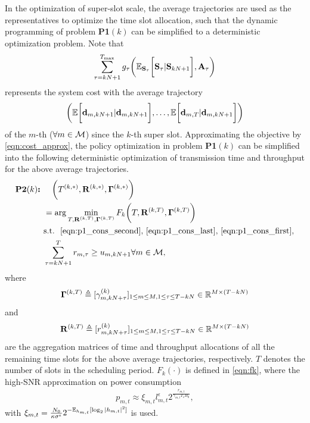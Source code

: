 In the optimization of super-slot scale, the average trajectories are used as the representatives to optimize the time slot allocation, such that the dynamic programming of problem \textbf{P1$(k)$} can be simplified to a deterministic optimization problem.
Note that
\begin{align}
    \sum_{\tau=kN+1}^{{T_{\max}}} g_{\tau}\bigg(
        \mathbb{E}_{\mathbf{S}_{\tau}}\bigg[ \mathbf{S}_{\tau} | \mathbf{S}_{kN+1} \bigg], \mathbf{A}_{\tau}
    \bigg)
    \label{eqn:cost_approx}
\end{align}
represents the system cost with the average trajectory
\begin{align}
    \bigg(
        \mathbb{E}\bigg[ \mathbf{d}_{m,kN+1} | \mathbf{d}_{m,kN+1} \bigg],
        \dots,
        \mathbb{E}\bigg[ \mathbf{d}_{m,T} | \mathbf{d}_{m,kN+1} \bigg]
    \bigg)
\end{align}
of the $m$-th {\IAV} ($\forall m\in\mathcal{M}$) since the $k$-th super slot. Approximating the objective by \eqref{eqn:cost_approx}, the policy optimization in problem \textbf{P1$(k)$} can be simplified into the following deterministic optimization of transmission time and throughput for the above average trajectories.
    \begin{align}
        \textbf{P2$(k)$:~} &
        ~~~\bigg(T^{(k,*)}, \mathbf{R}^{(k,*)}, \mathbf{\Gamma}^{(k,*)} \bigg)\nonumber \\
        & = \arg\min_{ T, \mathbf{R}^{(k,T)}, \mathbf{\Gamma}^{(k,T)} } F_k\bigg( T, \mathbf{R}^{(k,T)}, \mathbf{\Gamma}^{(k,T)} \bigg)\nonumber
            \\
        &\text{s.t.~} \text{ \eqref{eqn:p1_cons_second}, \eqref{eqn:p1_cons_last}, \eqref{eqn:p1_cons_first},}
        \nonumber\\
    & \sum_{ \tau=kN+1 }^{ T } r_{m,\tau} \geq {u}_{m,kN+1} \forall m\in\mathcal{M}, \label{eqn:constraint_T}
    \end{align}
where
$$
\mathbf{\Gamma}^{(k,T)} \triangleq [ \gamma^{(k)}_{m,kN+\tau} ]_{1 \leq m \leq M, 1 \leq \tau \leq T-kN} \in \mathbb{R}^{M \times (T-kN)}
$$
and
$$\mathbf{R}^{(k,T)} \triangleq [ r^{(k)}_{m,kN+\tau}]_{1 \leq m \leq M, 1 \leq \tau \leq T-kN} \in \mathbb{R}^{M \times (T-kN)}$$
are the aggregation matrices of time and throughput allocations of all the remaining time slots for the above average trajectories, respectively. $T$ denotes the number of slots in the scheduling period. $F_k(\cdot)$ is defined in \eqref{eqn:fk}, where the high-SNR approximation on power consumption
\begin{align}
    p_{m,t} \approx \xi_{m,t} l_{m,t}^{\epsilon} 2^{\frac{ r_{m,t} }{ \gamma_{m,t} T_{s} B_0 }},
\end{align}
with $\xi_{m,t} = \frac{N_0}{\kappa \sigma^\epsilon} 2^{-\mathbb{E}_{h_{m,t}}[\log_2{|h_{m,t}|^2}]}$ is used.


